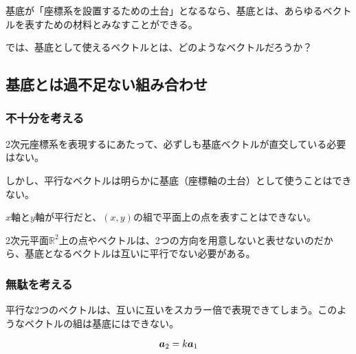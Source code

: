 \documentclass[../imaging-math]{subfiles}
\begin{document}
基底が「座標系を設置するための土台」となるなら、基底とは、あらゆるベクトルを表すための材料とみなすことができる。

\br

では、基底として使えるベクトルとは、どのようなベクトルだろうか？

\subsection{基底とは過不足ない組み合わせ}

\subsubsection{不十分を考える}

2次元座標系を表現するにあたって、必ずしも基底ベクトルが直交している必要はない。

しかし、平行なベクトルは明らかに基底（座標軸の土台）として使うことはできない。

\begin{center}
\end{center}

$x$軸と$y$軸が平行だと、$(x,y)$の組で平面上の点を表すことはできない。

2次元平面$\mathbb{R}^2$上の点やベクトルは、2つの方向を用意しないと表せないのだから、基底となるベクトルは互いに平行でない必要がある。

\subsubsection{無駄を考える}

平行な2つのベクトルは、互いに互いをスカラー倍で表現できてしまう。このようなベクトルの組は基底にはできない。

\begin{equation*}
  \vb*{a}_2 = k \vb*{a}_1
\end{equation*}
\end{document}
